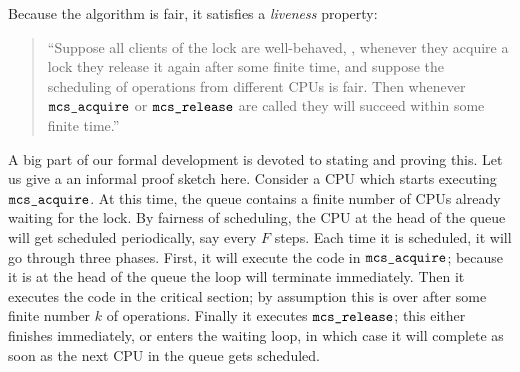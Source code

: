 Because the algorithm is fair, it satisfies a \emph{liveness}
property:\begin{quote}
``Suppose all clients of the lock are well-behaved, \ie, whenever they acquire a lock they release it again after some finite time, and suppose the scheduling of operations from different CPUs is fair. Then  whenever ${\mathrm{\texttt{mcs\_acquire}}}$ or ${\mathrm{\texttt{mcs\_release}}}$ are called they will succeed within some finite time.''
\end{quote}
A big part of our formal development is devoted to stating and proving
this.
Let us give a an informal proof sketch here. 
Consider a CPU which starts executing ${\mathrm{\texttt{mcs\_acquire}}}$.
At this time, the queue contains a finite number of CPUs already waiting for the lock.
By fairness of scheduling, the CPU at the head of the queue will get scheduled periodically, say every $F$ steps. Each time it is scheduled, it will go through three phases. 
First, it will execute the code in ${\mathrm{\texttt{mcs\_acquire}}}$; because it is at the head of the queue the loop will terminate immediately. 
Then it executes the code in the critical section; by assumption this is over after some finite number $k$ of operations. 
Finally it executes ${\mathrm{\texttt{mcs\_release}}}$; this either finishes immediately, or enters the waiting loop, in which case it will complete as soon as the next CPU in the queue gets scheduled. 





